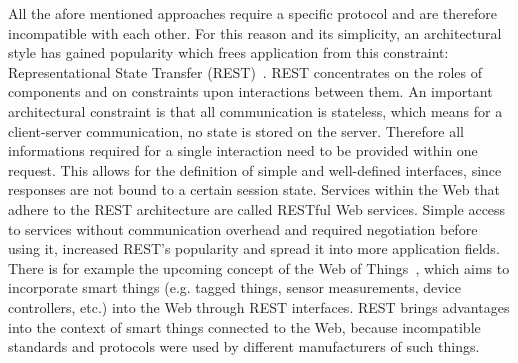 All the afore mentioned approaches require a specific protocol and are therefore incompatible with each other.
For this reason and its simplicity, an architectural style has gained popularity which frees application from this constraint: Representational State Transfer (\textrm{REST})~\cite{fielding2000architectural}.
\textrm{REST} concentrates on the roles of components and on constraints upon interactions between them.
An important architectural constraint is that all communication is stateless, which means for a client-server communication, no state is stored on the server.
Therefore all informations required for a single interaction need to be provided within one request.
This allows for the definition of simple and well-defined interfaces, since responses are not bound to a certain session state. 
Services within the Web that adhere to the \textrm{REST} architecture are called \textrm{RESTful} Web services.
Simple access to services without communication overhead and required negotiation before using it, increased \textrm{REST}'s popularity and spread it into more application fields.
There is for example the upcoming concept of the \textrm{Web of Things}~\cite{Guinard2011WoT}, which aims to incorporate smart things (e.g. tagged things, sensor measurements, device controllers, etc.) into the Web through \textrm{REST} interfaces.
\textrm{REST} brings advantages into the context of smart things connected to the Web, because incompatible standards and protocols were used by different manufacturers of such things.


